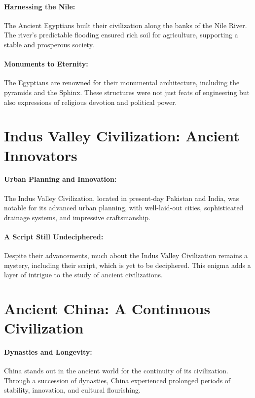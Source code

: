 \documentclass[a4paper,12pt]{book}
\begin{document}
\paragraph{Harnessing the Nile:}
The Ancient Egyptians built their civilization along the banks of the Nile River. The river's predictable flooding ensured rich soil for agriculture, supporting a stable and prosperous society.

\paragraph{Monuments to Eternity:}
The Egyptians are renowned for their monumental architecture, including the pyramids and the Sphinx. These structures were not just feats of engineering but also expressions of religious devotion and political power.

\section*{Indus Valley Civilization: Ancient Innovators}

\paragraph{Urban Planning and Innovation:}
The Indus Valley Civilization, located in present-day Pakistan and India, was notable for its advanced urban planning, with well-laid-out cities, sophisticated drainage systems, and impressive craftsmanship.

\paragraph{A Script Still Undeciphered:}
Despite their advancements, much about the Indus Valley Civilization remains a mystery, including their script, which is yet to be deciphered. This enigma adds a layer of intrigue to the study of ancient civilizations.

\section*{Ancient China: A Continuous Civilization}

\paragraph{Dynasties and Longevity:}
China stands out in the ancient world for the continuity of its civilization. Through a succession of dynasties, China experienced prolonged periods of stability, innovation, and cultural flourishing.
\end{document}
